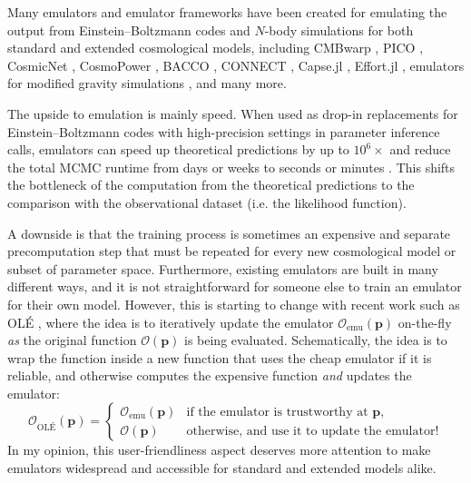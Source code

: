 \documentclass[USenglish, thumbmarks]{uiophdthesis} %
\newcommand\EB{Einstein--Boltzmann}
\begin{document}
Many emulators and emulator frameworks have been created
for emulating the output from \EB{} codes and $N$-body simulations
for both standard and extended cosmological models, including
CMBwarp \cite{jimenezFastCosmologicalParameter2004},
PICO \cite{fendtPicoParametersImpatient2007,fendtComputingHighAccuracy2007},
CosmicNet \cite{albersCosmicNetPhysicsdrivenImplementation2019,guntherCosmicNetIIEmulating2022},
CosmoPower \cite{manciniCOSMOPOWEREmulatingCosmological2022b,pirasCosmoPowerJAXHighdimensionalBayesian2023},
BACCO \cite{zennaroBACCOSimulationProject2023a},
CONNECT \cite{nygaardCONNECTNeuralNetwork2023},
Capse.jl \cite{boniciCapsejlEfficientAutodifferentiable2024},
Effort.jl \cite{boniciEffortjlFastDifferentiable2025},
emulators for modified gravity simulations \cite{wintherEmulatorsNonlinearMatter2019a,maulandSesamePowerSpectrum2024a},
and many more.

The upside to emulation is mainly speed.
When used as drop-in replacements for \EB{} codes with high-precision settings in parameter inference calls,
emulators can speed up theoretical predictions by up to $10^6\times$
and reduce the total MCMC runtime from days or weeks to seconds or minutes
\cite[e.g.][]{boniciCapsejlEfficientAutodifferentiable2024}.
This shifts the bottleneck of the computation from the theoretical predictions
to the comparison with the observational dataset (i.e. the likelihood function).

A downside is that the training process
is sometimes an expensive and separate precomputation step
that must be repeated for every new cosmological model or subset of parameter space.
Furthermore, existing emulators are built in many different ways,
and it is not straightforward for someone else to train an emulator for their own model.
However, this is starting to change with recent work such as OLÉ \cite{guntherOLEOnlineLearning2025},
where the idea is to iteratively update the emulator $\mathcal{O}_\text{emu}(\mathbf{p})$ on-the-fly
\emph{as} the original function $\mathcal{O}(\mathbf{p})$ is being evaluated.
Schematically, the idea is to wrap the function inside a new function
that uses the cheap emulator if it is reliable,
and otherwise computes the expensive function \emph{and} updates the emulator:
\begin{equation}
\mathcal{O}_\text{OLÉ}(\mathbf{p}) = \begin{cases}
    \mathcal{O}_\text{emu}(\mathbf{p}) & \text{if the emulator is trustworthy at $\mathbf{p}$,} \\
    \mathcal{O}(\mathbf{p}) & \text{otherwise, and use it to update the emulator!}
\end{cases}
\end{equation}
In my opinion, this user-friendliness aspect deserves more attention
to make emulators widespread and accessible for standard and extended models alike.
\end{document}
